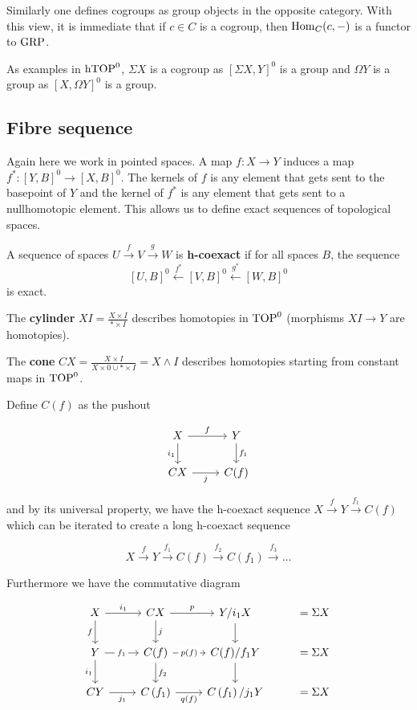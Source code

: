 Similarly one defines cogroups as group objects in the opposite category. With this view, it is immediate that if $c\in C$ is a cogroup, then $\operatorname{Hom}_C(c,-)$ is a functor to $\operatorname{GRP}$.

As examples in $\operatorname{hTOP}^0$, $\Sigma X$ is a cogroup as $\left[\Sigma X,Y\right]^0$ is a group and $\Omega Y$ is a group as $\left[X,\Omega Y\right]^0$ is a group.

\subsection{Fibre sequence}

Again here we work in pointed spaces. A map $f:X\to Y$ induces a map $f^*:[Y,B]^0\to[X,B]^0$. The kernels of $f$ is any element that gets sent to the basepoint of $Y$ and the kernel of $f^*$ is any element that gets sent to a nullhomotopic element. This allows us to define exact sequences of topological spaces.

A sequence of spaces $U\overset f\to V\overset g\to W$ is \textbf{h-coexact} if for all spaces $B$, the sequence
\[[U,B]^0\overset{f^*}\leftarrow[V,B]^0\overset{g^*}\leftarrow[W,B]^0\]
is exact.

The \textbf{cylinder} $XI=\frac{X\times I}{*\times I}$ describes homotopies in $\operatorname{TOP}^0$ (morphisms $XI\to Y$ are homotopies).

The \textbf{cone} $CX=\frac{X\times I}{X\times 0\cup*\times I}=X\wedge I$ describes homotopies starting from constant maps in $\operatorname{TOP}^0$.

Define $C(f)$ as the pushout

\[\begin{tikzcd}
	X & Y \\
	CX & {C(f)}
	\arrow["f", from=1-1, to=1-2]
	\arrow["{i_1}"', from=1-1, to=2-1]
	\arrow["j"', from=2-1, to=2-2]
	\arrow["{f_1}", from=1-2, to=2-2]
\end{tikzcd}\]

and by its universal property, we have the h-coexact sequence $X\overset f\to Y\overset{f_1}\to C(f)$ which can be iterated to create a long h-coexact sequence

\[X\overset f\to Y\overset{f_1}\to C(f)\overset{f_2}\to C\left(f_1\right)\overset{f_3}\to\dots\]

Furthermore we have the commutative diagram

\[\begin{tikzcd}
	X & CX & {Y/i_1X} & {=\Sigma X} \\
	Y & {C(f)} & {C(f)/f_1Y} & {=\Sigma X} \\
	CY & {C\left(f_1\right)} & {C\left(f_1\right)/j_1Y} & {=\Sigma X}
	\arrow["{i_1}", from=1-1, to=1-2]
	\arrow["f"', from=1-1, to=2-1]
	\arrow["{f_1}"{description}, from=2-1, to=2-2]
	\arrow["j", from=1-2, to=2-2]
	\arrow["{i_1}"', from=2-1, to=3-1]
	\arrow["{f_2}", from=2-2, to=3-2]
	\arrow["{j_1}"', from=3-1, to=3-2]
	\arrow["p", from=1-2, to=1-3]
	\arrow["{p(f)}"{description}, from=2-2, to=2-3]
	\arrow["{q(f)}"', from=3-2, to=3-3]
	\arrow[from=1-3, to=2-3]
	\arrow[from=2-3, to=3-3]
\end{tikzcd}\]

